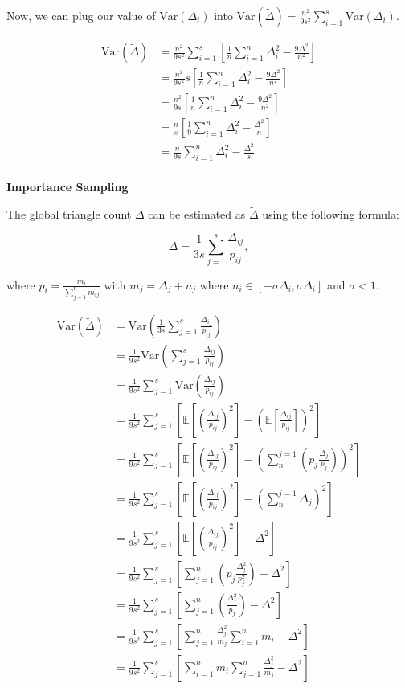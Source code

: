 \documentclass[11pt]{article}
\newcommand{\subsubsubsection}[1]{
  \vspace{1em} %
  \noindent\textbf{#1} %
  \vspace{0.5em} %
}
\begin{document}
Now, we can plug our value of $\mathrm{Var}(\Delta_i)$ into $\mathrm{Var}(\tilde{\Delta}) = \frac{n^2}{9s^2} \sum_{i=1}^{s} \mathrm{Var}(\Delta_i)$.

\[
\begin{aligned}
\mathrm{Var}(\tilde{\Delta}) &= \frac{n^2}{9s^2} \sum_{i=1}^{s} [\frac{1}{n} \sum_{i = 1}^{n} \Delta_i^2 - \frac{9\Delta^2}{n^2}] \\
&= \frac{n^2}{9s^2} s [\frac{1}{n} \sum_{i = 1}^{n} \Delta_i^2 - \frac{9\Delta^2}{n^2}] \\
&= \frac{n^2}{9s} [\frac{1}{n} \sum_{i = 1}^{n} \Delta_i^2 - \frac{9\Delta^2}{n^2}] \\
&= \frac{n}{s} [\frac{1}{9}\sum_{i = 1}^{n} \Delta_i^2 - \frac{\Delta^2}{n}] \\
&= \frac{n}{9s} \sum_{i = 1}^{n} \Delta_i^2 - \frac{\Delta^2}{s} \\
\end{aligned}
\]

\subsubsubsection{Importance Sampling}

The global triangle count $\Delta$ can be estimated as $\tilde{\Delta}$ using the following formula:

\[
\tilde{\Delta} = \frac{1}{3s} \sum_{j = 1}^{s} \frac{\Delta_{ij}}{p_{ij}},
\]

where $p_i = \frac{m_i}{\sum_{j = 1}^{n}m_{ij}}$ with $m_j = \Delta_j + n_j$ where $n_i \in [-\sigma \Delta_i, \sigma \Delta_i]$ and $\sigma < 1$.

\[
\begin{aligned}
\mathrm{Var}(\tilde{\Delta}) &= \mathrm{Var} \left( \frac{1}{3s} \sum_{j = 1}^{s} \frac{\Delta_{ij}}{p_{ij}} \right) \\
&= \frac{1}{9s^2} \mathrm{Var} \left( \sum_{j = 1}^{s} \frac{\Delta_{ij}}{p_{ij}} \right) \\
&= \frac{1}{9s^2} \sum_{j = 1}^{s} \mathrm{Var} \left( \frac{\Delta_{ij}}{p_{ij}} \right) \\
&= \frac{1}{9s^2} \sum_{j = 1}^{s} [\mathbb{E}[(\frac{\Delta_{ij}}{p_{ij}})^2] - (\mathbb{E}[\frac{\Delta_{ij}}{p_{ij}}])^2] \\
&= \frac{1}{9s^2} \sum_{j = 1}^{s} [\mathbb{E}[(\frac{\Delta_{ij}}{p_{ij}})^2] - (\sum_{n}^{j=1}(p_j \frac{\Delta_j}{p_j}))^2] \\
&= \frac{1}{9s^2} \sum_{j = 1}^{s} [\mathbb{E}[(\frac{\Delta_{ij}}{p_{ij}})^2] - (\sum_{n}^{j=1}\Delta_j)^2] \\
&= \frac{1}{9s^2} \sum_{j = 1}^{s} [\mathbb{E}[(\frac{\Delta_{ij}}{p_{ij}})^2] - \Delta^2] \\
&= \frac{1}{9s^2} \sum_{j = 1}^{s} [\sum_{j = 1}^{n}(p_j \frac{\Delta_j^2}{p_j^2}) - \Delta^2] \\
&= \frac{1}{9s^2} \sum_{j = 1}^{s} [\sum_{j = 1}^{n}(\frac{\Delta_j^2}{p_j}) - \Delta^2] \\
&= \frac{1}{9s^2} \sum_{j = 1}^{s} [\sum_{j = 1}^{n}\frac{\Delta_j^2}{m_j} \sum_{i = 1}^{n}m_i - \Delta^2] \\
&= \frac{1}{9s^2} \sum_{j = 1}^{s} [\sum_{i = 1}^{n}m_i \sum_{j = 1}^{n}\frac{\Delta_j^2}{m_j} - \Delta^2] \\
\end{aligned}
\]
\end{document}
